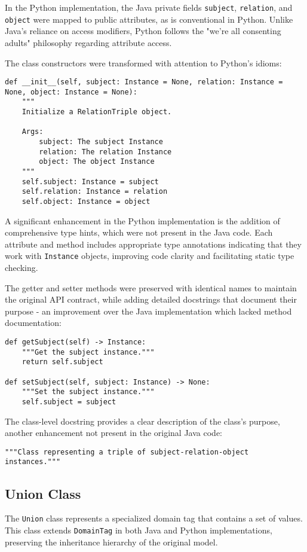 \documentclass[12pt,a4paper]{article}
\begin{document}
In the Python implementation, the Java private fields \texttt{subject}, \texttt{relation}, and \texttt{object} were mapped to public attributes, as is conventional in Python. Unlike Java's reliance on access modifiers, Python follows the "we're all consenting adults" philosophy regarding attribute access.

The class constructors were transformed with attention to Python's idioms:

\begin{verbatim}
def __init__(self, subject: Instance = None, relation: Instance = None, object: Instance = None):
    """
    Initialize a RelationTriple object.
    
    Args:
        subject: The subject Instance
        relation: The relation Instance
        object: The object Instance
    """
    self.subject: Instance = subject
    self.relation: Instance = relation
    self.object: Instance = object
\end{verbatim}

A significant enhancement in the Python implementation is the addition of comprehensive type hints, which were not present in the Java code. Each attribute and method includes appropriate type annotations indicating that they work with \texttt{Instance} objects, improving code clarity and facilitating static type checking.

The getter and setter methods were preserved with identical names to maintain the original API contract, while adding detailed docstrings that document their purpose - an improvement over the Java implementation which lacked method documentation:

\begin{verbatim}
def getSubject(self) -> Instance:
    """Get the subject instance."""
    return self.subject
    
def setSubject(self, subject: Instance) -> None:
    """Set the subject instance."""
    self.subject = subject
\end{verbatim}

The class-level docstring provides a clear description of the class's purpose, another enhancement not present in the original Java code:

\begin{verbatim}
"""Class representing a triple of subject-relation-object instances."""
\end{verbatim}


\subsection{Union Class}
The \texttt{Union} class represents a specialized domain tag that contains a set of values. This class extends \texttt{DomainTag} in both Java and Python implementations, preserving the inheritance hierarchy of the original model.
\end{document}
